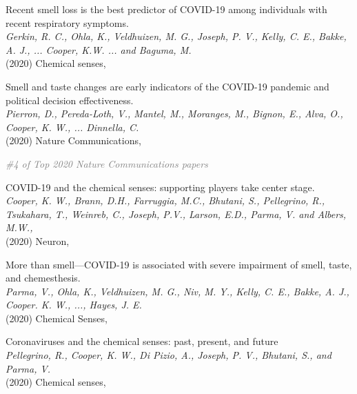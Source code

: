 \documentclass[10pt]{cooperCV2}
\begin{document}
\begin{etaremune}[ resume, itemindent=-\bibhang, topsep=0pt,
				   itemsep=\bibsep,partopsep=0pt,parsep=0pt,leftmargin={\bibhang+\widthof{[999]}}] 
    
    \item Recent smell loss is the best predictor of COVID-19 among individuals with recent respiratory symptoms. \\
     \textit{Gerkin, R. C., Ohla, K., Veldhuizen, M. G., Joseph, P. V., Kelly, C. E., Bakke, A. J., ... Cooper, K.W. ... and Baguma, M. }\\
     (2020) Chemical senses, 
     
	
    \item Smell and taste changes are early indicators of the COVID-19 pandemic and political decision effectiveness. \\
     \textit{Pierron, D., Pereda-Loth, V., Mantel, M., Moranges, M., Bignon, E., Alva, O.,  Cooper, K. W., ... Dinnella, C. }\\
     (2020) Nature Communications, 
     
     	\begin{innerlist}
     	
	     \item  \textcolor{grey}{\textit{\#4 of Top 2020 Nature Communications papers} }
     	
     	\end{innerlist}
     
	
    \item COVID-19 and the chemical senses: supporting players take center stage. \\
     \textit{Cooper, K. W., Brann, D.H., Farruggia, M.C., Bhutani, S., Pellegrino, R., Tsukahara, T., Weinreb, C., Joseph, P.V., Larson, E.D., Parma, V. and Albers, M.W.,}\\
     (2020) Neuron, 
     
	
    \item More than smell—COVID-19 is associated with severe impairment of smell, taste, and chemesthesis. \\
     \textit{Parma, V., Ohla, K., Veldhuizen, M. G., Niv, M. Y., Kelly, C. E., Bakke, A. J., Cooper. K. W., ..., Hayes, J. E.}\\
     (2020) Chemical Senses, 
     
	
    \item Coronaviruses and the chemical senses: past, present, and future \\
     \textit{Pellegrino, R., Cooper, K. W., Di Pizio, A., Joseph, P. V., Bhutani, S., and Parma, V. }\\
     (2020) Chemical senses, 
     

\end{etaremune}
\end{document}
